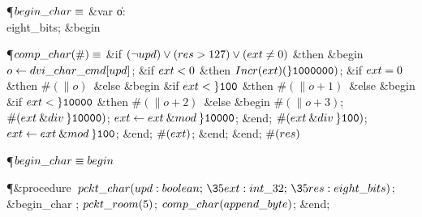 \Y\P\D {}$\\{begin\_char}\S$\1\6
\4\&{var} \|o: \\{eight\_bits};\2\6
\&{begin} \par
\P\D {}$\\{comp\_char}(\#)\S$\1\6
\&{if} $(\R\\{upd})\V(\\{res}>127)\V(\\{ext}\I0)$ \1\&{then}\6
\&{begin} $\|o\K\\{dvi\_char\_cmd}[\\{upd}]$;\6
\&{if} $\\{ext}<0$ \1\&{then}\5
$\\{Incr}(\\{ext})(\H{1000000})$;\2\6
\&{if} $\\{ext}=0$ \1\&{then}\5
$\#(\|o)$\ \&{else} \2\6
\&{begin} \&{if} $\\{ext}<\H{100}$ \1\&{then}\5
$\#(\|o+1)$\ \&{else} \2\6
\&{begin} \&{if} $\\{ext}<\H{10000}$ \1\&{then}\5
$\#(\|o+2)$\ \&{else} \2\6
\&{begin} $\#(\|o+3)$;\5
$\#(\\{ext}\mathbin{\&{div}}\H{10000})$;\5
$\\{ext}\K\\{ext}\mathbin{\&{mod}}\H{10000}$;\6
\&{end};\5
$\#(\\{ext}\mathbin{\&{div}}\H{100})$;\5
$\\{ext}\K\\{ext}\mathbin{\&{mod}}\H{100}$;\6
\&{end};\5
$\#(\\{ext})$;\6
\&{end};\6
\&{end};\2\2\6
$\#(\\{res})$\par
\P\F {}$\\{begin\_char}\S\\{begin}$\par
\Y\P\4\&{procedure}\1\  $\\{pckt\_char}(\\{upd}:\\{boolean};\,\35\\{ext}:%
\\{int\_32};\,\35\\{res}:\\{eight\_bits})$;\2\6
\&{begin\_char} ;\5
$\\{pckt\_room}(5)$;\5
$\\{comp\_char}(\\{append\_byte})$;\6
\&{end};\par
\fi

